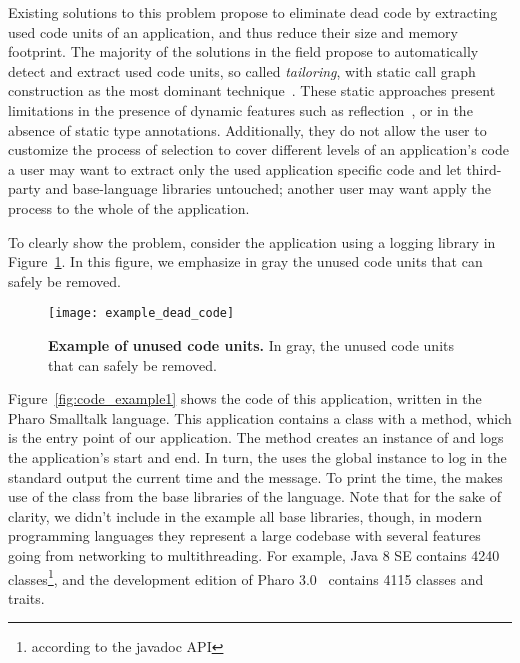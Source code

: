 Existing solutions to this problem propose to eliminate dead code by extracting used code units of an application, and thus reduce their size and memory footprint. The majority of the solutions in the field propose to automatically detect and extract used code units, so called \emph{tailoring}, with static call graph construction as the most dominant technique~\cite{Grov97a}. 
These static approaches present limitations in the presence of dynamic features such as reflection~\cite{Livs05a}, or in the absence of static type annotations. Additionally, they do not allow the user to customize the process of selection to cover different levels of an application's code \ie a user may want to extract only the used application specific code and let third-party and base-language libraries untouched; another user may want apply the process to the whole of the application.



To clearly show the problem, consider the application using a logging library in Figure~\ref{fig:example_dead_code}. In this figure, we emphasize in gray the unused code units that can safely be removed.

\begin{figure}[ht]
\begin{center}
\texttt{[image: example\_dead\_code]}
\caption{\small\textbf{Example of unused code units.} In gray, the unused code units that can safely be removed.\label{fig:example_dead_code}}
\end{center}
\end{figure}

Figure~\ref{fig:code_example1} shows the code of this application, written in the Pharo Smalltalk language. This application contains a  class with a  method, which is the entry point of our application. The  method creates an instance of  and logs the application's start and end. In turn, the  uses the  global instance to log in the standard output the current time and the message. To print the time, the  makes use of the  class from the base libraries of the language. Note that for the sake of clarity, we didn't include in the example all base libraries, though, in modern programming languages they represent a large codebase with several features going from networking to multithreading. For example, Java 8 SE contains 4240 classes\footnote{according to the javadoc API}, and the development edition of Pharo 3.0~\cite{Blac09a} contains 4115 classes and traits.

